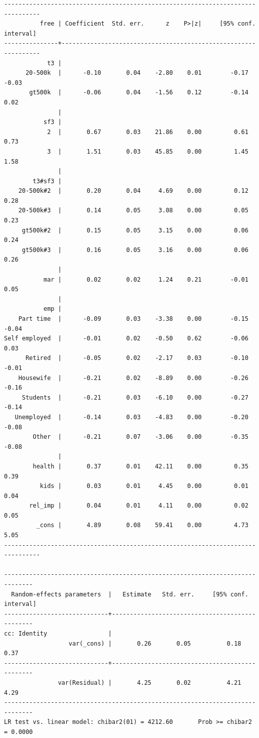 \documentclass[10pt, letterpaper]{article}
\begin{document}
\begin{spacing}{1.4}
\begin{scriptsize}
\begin{spacing}{.19}
\begin{verbatim}
--------------------------------------------------------------------------------
          free | Coefficient  Std. err.      z    P>|z|     [95% conf. interval]
---------------+----------------------------------------------------------------
            t3 |
      20-500k  |      -0.10       0.04    -2.80    0.01        -0.17       -0.03
       gt500k  |      -0.06       0.04    -1.56    0.12        -0.14        0.02
               |
           sf3 |
            2  |       0.67       0.03    21.86    0.00         0.61        0.73
            3  |       1.51       0.03    45.85    0.00         1.45        1.58
               |
        t3#sf3 |
    20-500k#2  |       0.20       0.04     4.69    0.00         0.12        0.28
    20-500k#3  |       0.14       0.05     3.08    0.00         0.05        0.23
     gt500k#2  |       0.15       0.05     3.15    0.00         0.06        0.24
     gt500k#3  |       0.16       0.05     3.16    0.00         0.06        0.26
               |
           mar |       0.02       0.02     1.24    0.21        -0.01        0.05
               |
           emp |
    Part time  |      -0.09       0.03    -3.38    0.00        -0.15       -0.04
Self employed  |      -0.01       0.02    -0.50    0.62        -0.06        0.03
      Retired  |      -0.05       0.02    -2.17    0.03        -0.10       -0.01
    Housewife  |      -0.21       0.02    -8.89    0.00        -0.26       -0.16
     Students  |      -0.21       0.03    -6.10    0.00        -0.27       -0.14
   Unemployed  |      -0.14       0.03    -4.83    0.00        -0.20       -0.08
        Other  |      -0.21       0.07    -3.06    0.00        -0.35       -0.08
               |
        health |       0.37       0.01    42.11    0.00         0.35        0.39
          kids |       0.03       0.01     4.45    0.00         0.01        0.04
       rel_imp |       0.04       0.01     4.11    0.00         0.02        0.05
         _cons |       4.89       0.08    59.41    0.00         4.73        5.05
--------------------------------------------------------------------------------

------------------------------------------------------------------------------
  Random-effects parameters  |   Estimate   Std. err.     [95% conf. interval]
-----------------------------+------------------------------------------------
cc: Identity                 |
                  var(_cons) |       0.26       0.05          0.18        0.37
-----------------------------+------------------------------------------------
               var(Residual) |       4.25       0.02          4.21        4.29
------------------------------------------------------------------------------
LR test vs. linear model: chibar2(01) = 4212.60       Prob >= chibar2 = 0.0000


\end{verbatim}
\end{spacing}
\end{scriptsize}
\end{spacing}
\end{document}
